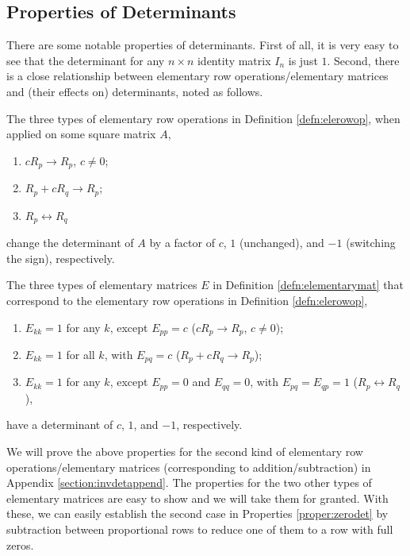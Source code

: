 \subsection{Properties of Determinants} There are some notable properties of determinants. First of all, it is very easy to see that the determinant for any $n \times n$ identity matrix $I_n$ is just $1$. Second, there is a close relationship between elementary row operations/elementary matrices and (their effects on) determinants, noted as follows.
\begin{proper}
\label{proper:elementaryopdet}
The three types of elementary row operations in Definition \ref{defn:elerowop}, when applied on some square matrix $A$,
\begin{enumerate}
\item $cR_{p} \to R_{p}$, $c \neq 0$;
\item $R_{p} + cR_{q} \to R_{p}$;
\item $R_{p} \leftrightarrow R_{q}$
\end{enumerate}
change the determinant of $A$ by a factor of $c$, $1$ (unchanged), and $-1$ (switching the sign), respectively.
\end{proper}
\begin{proper}
\label{proper:elementarymatdet}
The three types of elementary matrices $E$ in Definition \ref{defn:elementarymat} that correspond to the elementary row operations in Definition \ref{defn:elerowop},
\begin{enumerate}
\item $E_{kk} = 1$ for any $k$, except $E_{pp} = c$ ($cR_{p} \to R_{p}$, $c \neq 0$);
\item $E_{kk} = 1$ for all $k$, with $E_{pq} = c$ ($R_{p} + cR_{q} \to R_{p}$);
\item $E_{kk} = 1$ for any $k$, except $E_{pp} = 0$ and $E_{qq} = 0$, with $E_{pq} = E_{qp} = 1$ ($R_{p} \leftrightarrow R_{q}$),
\end{enumerate}
have a determinant of $c$, $1$, and $-1$, respectively.
\end{proper}
We will prove the above properties for the second kind of elementary row
operations/elementary matrices (corresponding to addition/subtraction) in Appendix \ref{section:invdetappend}. The properties for the two other types of elementary matrices are easy to show and we will take them for granted. With these, we can easily establish the second case in Properties \ref{proper:zerodet} by subtraction between proportional rows to reduce one of them to a row with full zeros.\par

